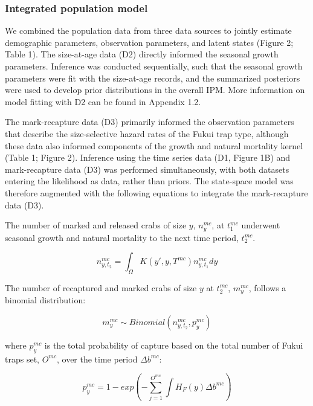 \documentclass{article}
\begin{document}
\subsubsection*{Integrated population model}

We combined the population data from three data sources to jointly estimate demographic parameters, observation parameters, and latent states (Figure 2; Table 1). The size-at-age data (D2) directly informed the seasonal growth parameters. Inference was conducted sequentially, such that the seasonal growth parameters were fit with the size-at-age records, and the summarized posteriors were used to develop prior distributions in the overall IPM. More information on model fitting with D2 can be found in Appendix 1.2. 

The mark-recapture data (D3) primarily informed the observation parameters that describe the size-selective hazard rates of the Fukui trap type, although these data also informed components of the growth and natural mortality kernel (Table 1; Figure 2). Inference using the time series data (D1, Figure 1B) and mark-recapture data (D3) was performed simultaneously, with both datasets entering the likelihood as data, rather than priors. The state-space model was therefore augmented with the following equations to integrate the mark-recapture data (D3).

The number of marked and released crabs of size $y$, $n_y^{mc}$, at $t_1^{mc}$ underwent seasonal growth and natural mortality to the next time period, $t_2^{mc}$.

\begin{equation}
n_{y,t_2}^{mc} = \int_{\Omega} K(y',y, T^{mc}) n_{y,t_1}^{mc} dy 
\end{equation}

The number of recaptured and marked crabs of size $y$ at $t_2^{mc}$, $m_{y}^{mc}$, follows a binomial distribution:

\begin{equation}
m_{y}^{mc} \sim Binomial(n_{y,t_2}^{mc}, p_y^{mc}) 
\end{equation}

where $p_y^{mc}$ is the total probability of capture based on the total number of Fukui traps set, $O^{mc}$, over the time period $\Delta b^{mc}$:

\begin{equation}
p_y^{mc} = 1-exp(-\sum_{j=1}^{O^{mc}}\int H_F(y)\Delta b^{mc})
\end{equation}
\end{document}
